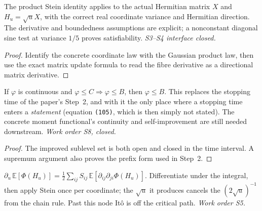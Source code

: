 \begin{lemma}\label{lem:stein}
  \leanok
  The product Stein identity applies to the actual Hermitian matrix $X$ and
  $H_u=\sqrt uX$, with the correct real coordinate variance and Hermitian
  direction.  The derivative and boundedness assumptions are explicit; a
  nonconstant diagonal sine test at variance $1/5$ proves satisfiability.
  \emph{S3--S4 interface closed.}
\end{lemma}
\begin{proof}\leanok
  Identify the concrete coordinate law with the Gaussian product law, then
  use the exact matrix update formula to read the fibre derivative as a
  directional matrix derivative.
\end{proof}

\begin{lemma}\label{lem:bootstrap}
  \leanok
  If $\varphi$ is continuous and $\varphi\le C\Rightarrow\varphi\le B$, then
  $\varphi\le B$.  This replaces the stopping time of the paper's Step~2, and
  with it the only place where a stopping time enters a \emph{statement}
  (equation \texttt{(105)}, which is then simply not stated).
  The concrete moment functional's continuity and self-improvement are still
  needed downstream. \emph{Work order S8, closed.}
\end{lemma}
\begin{proof}\leanok
  The improved sublevel set is both open and closed in the time interval.
  A supremum argument also proves the prefix form used in Step~2.
\end{proof}

\begin{lemma}\label{lem:generator}
  $\partial_u\,\mathbb E[\Phi(H_u)]=\tfrac12\sum_{ij}S_{ij}\,\mathbb E[\partial_{ij}\partial_{ji}\Phi(H_u)]$.
  Differentiate under the integral, then apply Stein once per coordinate; the
  $\sqrt u$ it produces cancels the $(2\sqrt u)^{-1}$ from the chain rule.  Past
  this node It\^o is off the critical path.  \emph{Work order S5.}
\end{lemma}

